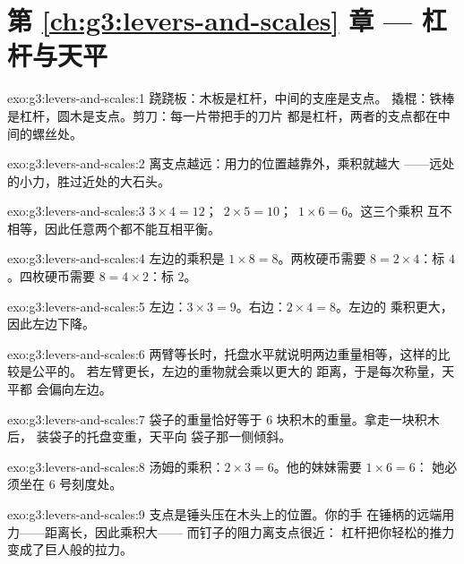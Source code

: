 \section*{第 \ref{ch:g3:levers-and-scales} 章 --- 杠杆与天平}

\begin{solution}{exo:g3:levers-and-scales:1}
跷跷板：木板是杠杆，中间的支座是支点。
撬棍：铁棒是杠杆，圆木是支点。剪刀：每一片带把手的刀片
都是杠杆，两者的支点都在中间的螺丝处。
\end{solution}

\begin{solution}{exo:g3:levers-and-scales:2}
离支点越远：用力的位置越靠外，乘积就越大
——远处的小力，胜过近处的大石头。
\end{solution}

\begin{solution}{exo:g3:levers-and-scales:3}
$3 \times 4 = 12$；\ $2 \times 5 = 10$；\ $1 \times 6 = 6$。这三个乘积
互不相等，因此任意两个都不能互相平衡。
\end{solution}

\begin{solution}{exo:g3:levers-and-scales:4}
左边的乘积是 $1 \times 8 = 8$。两枚硬币需要 $8 = 2 \times
4$：标 $4$。四枚硬币需要 $8 = 4 \times 2$：标 $2$。
\end{solution}

\begin{solution}{exo:g3:levers-and-scales:5}
左边：$3 \times 3 = 9$。右边：$2 \times 4 = 8$。左边的
乘积更大，因此左边下降。
\end{solution}

\begin{solution}{exo:g3:levers-and-scales:6}
两臂等长时，托盘水平就说明两边重量相等，这样的比较是公平的。
若左臂更长，左边的重物就会乘以更大的
距离，于是每次称量，天平都
会偏向左边。
\end{solution}

\begin{solution}{exo:g3:levers-and-scales:7}
袋子的重量恰好等于 $6$ 块积木的重量。拿走一块积木后，
装袋子的托盘变重，天平向
袋子那一侧倾斜。
\end{solution}

\begin{solution}{exo:g3:levers-and-scales:8}
汤姆的乘积：$2 \times 3 = 6$。他的妹妹需要 $1 \times 6 = 6$：
她必须坐在 $6$ 号刻度处。
\end{solution}

\begin{solution}{exo:g3:levers-and-scales:9}
支点是锤头压在木头上的位置。你的手
在锤柄的远端用力——距离长，因此乘积大——
而钉子的阻力离支点很近：
杠杆把你轻松的推力变成了巨人般的拉力。
\end{solution}


